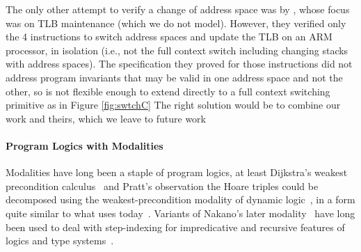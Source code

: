 The only other attempt to verify a change of address space was by \citet{syeda2018program,syeda2020formal}, whose focus was on TLB maintenance (which we
do not model). However, they verified only the 4 instructions to switch address spaces and update the TLB on an ARM processor, in isolation
(i.e., not the full context switch including changing stacks with address spaces).
The specification they proved for those instructions did not address program invariants that may be valid in one address space and not the other,
so is not flexible enough to extend directly to a full context switching primitive as in Figure \ref{fig:swtchC}
The right  solution would be to combine our work
and  theirs,  which we leave to future work

\paragraph{Program Logics with Modalities}
Modalities have long been a staple of program logics, at least  Dijkstra's weakest precondition calculus~\cite{dijkstra1975guarded}
and Pratt's observation the Hoare triples
could be decomposed using the weakest-precondition modality of dynamic logic~\cite{pratt1976semantical},
in a form quite similar to what \iris uses today~\cite{jung2018iris}.
Variants of Nakano's later modality~\cite{nakano2000modality} have long been used to deal with step-indexing 
for impredicative and recursive features of logics and type systems~\cite{Appel2007,hobor2010theory,birkedal2011step,birkedal2013intensional,jung2018iris}.

